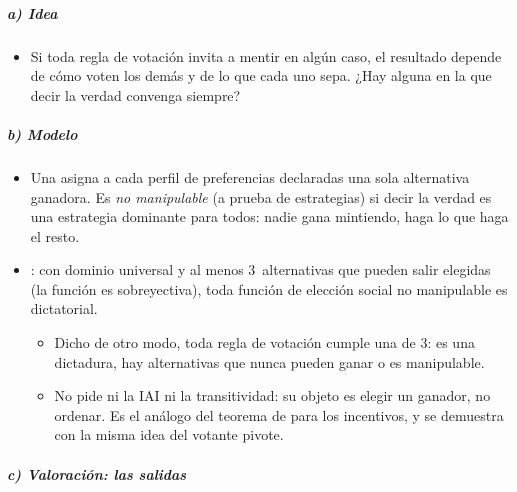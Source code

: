 \documentclass[11pt]{article}
\begin{document}
\subparagraph{a) Idea}

\begin{itemize}
\item Si toda regla de votación invita a mentir en algún caso, el resultado depende de cómo voten los demás y de lo que cada uno sepa. ¿Hay alguna en la que decir la verdad convenga siempre?
\end{itemize}

\subparagraph{b) Modelo}

\begin{itemize}
\item Una  asigna a cada perfil de preferencias declaradas una sola alternativa ganadora. Es \emph{no manipulable} (a prueba de estrategias) si decir la verdad es una estrategia dominante para todos: nadie gana mintiendo, haga lo que haga el resto.
\item {}\nocite{Gibbard1973Manipulation,Satterthwaite1975Strategy}: con dominio universal y al menos 3~alternativas que pueden salir elegidas (la función es sobreyectiva), toda función de elección social no manipulable es dictatorial.
  \begin{itemize}
  \item Dicho de otro modo, toda regla de votación cumple una de 3: es una dictadura, hay alternativas que nunca pueden ganar o es manipulable.
  \item No pide ni la IAI ni la transitividad: su objeto es elegir un ganador, no ordenar. Es el análogo del teorema de  para los incentivos, y se demuestra con la misma idea del votante pivote\nocite{Reny2001Arrow}.
  \end{itemize}
\end{itemize}

\subparagraph{c) Valoración: las salidas}
\end{document}
